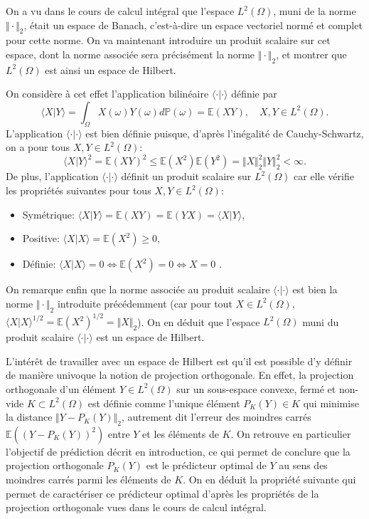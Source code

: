 On a vu dans le cours de calcul intégral que l'espace \(L^2(\Omega)\),
muni de la norme \(\Vert \cdot\Vert_2\), était un espace de Banach,
c'est-à-dire un espace vectoriel normé et complet pour cette norme. On
va maintenant introduire un produit scalaire sur cet espace, dont la
norme associée sera précisément la norme \(\Vert \cdot\Vert_2\), et
montrer que \(L^2(\Omega)\) est ainsi un espace de Hilbert.

On considère à cet effet l'application bilinéaire
\(\langle \cdot \vert \cdot\rangle\) définie par
\[\langle X \vert Y\rangle = \int_{\Omega} X(\omega) Y(\omega) d\mathbb{P}(\omega) = \mathbb{E}(XY), \quad X,Y\in L^2(\Omega).\]
L'application \(\langle \cdot \vert \cdot\rangle\) est bien définie
puisque, d'après l'inégalité de Cauchy-Schwartz, on a pour tous
\(X,Y\in L^2(\Omega)\):
\[\langle X \vert Y\rangle^2=\mathbb{E}(XY)^2 \leq \mathbb{E}(X^2)\mathbb{E}(Y^2)=\Vert X\Vert_2^2\Vert Y\Vert_2^2<\infty.\]
De plus, l'application \(\langle \cdot \vert \cdot\rangle\) définit un
produit scalaire sur \(L^2(\Omega)\) car elle vérifie les propriétés
suivantes pour tous \(X,Y\in L^2(\Omega)\):

\begin{itemize}
\tightlist
\item
  Symétrique:
  \(\langle X \vert Y\rangle= \mathbb{E}(XY)=\mathbb{E}(YX)=\langle X \vert Y\rangle\),
\item
  Positive: \(\langle X \vert X\rangle= \mathbb{E}(X^2) \ge 0\),
\item
  Définie:
  \(\langle X \vert X\rangle=0 \Leftrightarrow \mathbb{E}(X^2)=0 \Leftrightarrow X=0\)
  .
\end{itemize}

On remarque enfin que la norme associée au produit scalaire
\(\langle \cdot \vert \cdot\rangle\) est bien la norme
\(\Vert\cdot\Vert_2\) introduite précédemment (car pour tout
\(X\in L^2(\Omega)\),
\(\langle X \vert X\rangle^{1/2}=\mathbb{E}(X^2)^{1/2}=\Vert X\Vert_2\)).
On en déduit que l'espace \(L^2(\Omega)\) muni du produit scalaire
\(\langle \cdot \vert \cdot\rangle\) est un espace de Hilbert.

L'intérêt de travailler avec un espace de Hilbert est qu'il est possible
d'y définir de manière univoque la notion de projection orthogonale. En
effet, la projection orthogonale d'un élément \(Y\in L^2(\Omega)\) sur
un sous-espace convexe, fermé et non-vide \(K \subset L^2(\Omega)\) est
définie comme l'unique élément \(P_K(Y)\in K\) qui minimise la distance
\(\Vert Y - P_K(Y)\Vert_2\), autrement dit l'erreur des moindres carrés
\(\mathbb{E}((Y-P_K(Y))^2)\) entre \(Y\) et les éléments de \(K\). On
retrouve en particulier l'objectif de prédiction décrit en introduction,
ce qui permet de conclure que la projection orthogonale \(P_K(Y)\) est
le prédicteur optimal de \(Y\) au sens des moindres carrés parmi les
éléments de \(K\). On en déduit la propriété suivante qui permet de
caractériser ce prédicteur optimal d'après les propriétés de la
projection orthogonale vues dans le cours de calcul intégral.

